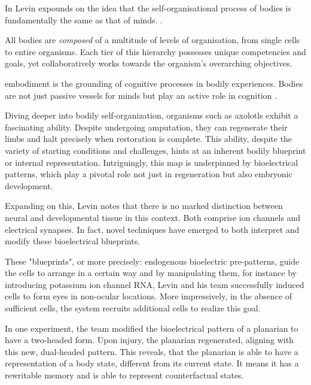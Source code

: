 In  Levin expounds on the idea that the self-organisational process of bodies is fundamentally the same as that of minds. 
. 

All bodies are \emph{composed} of a multitude of levels of organisation, from single cells to entire organisms. Each tier of this hierarchy possesses unique competencies and goals, yet collaboratively works towards the organism's overarching objectives.

\Gls{embodiment} is the grounding of cognitive processes in bodily experiences. Bodies are not just passive vessels for minds but play an active role in cognition . 

Diving deeper into bodily self-organization, organisms such as axolotls exhibit a fascinating ability. Despite undergoing amputation, they can regenerate their limbs and halt precisely when restoration is complete. This ability, despite the variety of starting conditions and challenges, hints at an inherent bodily blueprint or internal representation. Intriguingly, this map is underpinned by bioelectrical patterns, which play a pivotal role not just in regeneration but also embryonic development.

Expanding on this, Levin notes that there is no marked distinction between neural and developmental tissue in this context. Both comprise ion channels and electrical synapses. In fact, novel techniques have emerged to both interpret and modify these bioelectrical blueprints. 

These "blueprints", or more precisely: endogenous bioelectric pre-patterns, guide the cells to arrange in a certain way and by manipulating them, for instance by introducing potassium ion channel RNA, Levin and his team successfully induced cells to form eyes in non-ocular locations. More impressively, in the absence of sufficient cells, the system recruits additional cells to realize this goal.

In one experiment, the team modified the bioelectrical pattern of a planarian to have a two-headed form. Upon injury, the planarian regenerated, aligning with this new, dual-headed pattern. This reveals, that the planarian is able to have a representation of a body state, different from its current state. It means it has a rewritable memory and is able to represent \gls{counterfactual states}.

